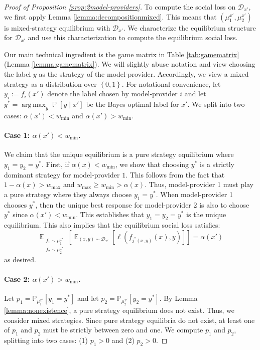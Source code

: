 \documentclass[letterpaper,11pt]{article}
\theoremstyle{plain}
\DeclareMathOperator*{\argmax}{arg\,max}
\DeclareMathOperator*{\E}{\mathbb{E}}
\DeclareMathOperator*{\Prob}{\mathbb{P}}
\begin{document}
\begin{proof}[Proof of Proposition \ref{prop:2model-providers}]
To compute the social loss on $\mathcal{D}_{x'}$, we first apply Lemma \ref{lemma:decompositionmixed}. This means that $(\mu^{x'}_1, \mu^{x'}_2)$ is mixed-strategy equilibrium with $\mathcal{D}_{x'}$. 
We characterize the equilibrium structure for $\mathcal{D}_{x'}$ and use this characterization to compute the equilibrium social loss. 



Our main technical ingredient is the game matrix in Table \ref{tab:gamematrix} (Lemma \ref{lemma:gamematrix}). We will slightly abuse notation and view choosing the label $y$ as the strategy of the model-provider. Accordingly, we view a mixed strategy as a distribution over $\left\{0,1\right\}$. For notational convenience, let $y_i := f_i(x')$ denote the label chosen by model-provider $i$ and let $y^* =  \argmax_{y} \Prob[y \mid x']$ be the Bayes optimal label for $x'$. 
We split into two cases: $\alpha(x') < w_{\text{min}}$ and $\alpha(x') > w_{\text{min}}$.

\paragraph{Case 1: $\alpha(x') < w_{\text{min}}$.} We claim that the unique equilibrium is a pure strategy equilibrium where $y_1 = y_2 = y^*$. First, if $\alpha(x) < w_{\text{min}}$, we show that choosing $y^*$ is a strictly dominant strategy for model-provider $1$. This follows from the fact that $1-\alpha(x) > w_{\text{max}}$ and $w_{\text{max}} \ge w_{\text{min}} >  \alpha(x)$. Thus, model-provider 1 must play a pure strategy where they always choose $y_1 = y^*$. When model-provider 1 chooses $y^*$, then the unique best response for model-provider 2 is also to choose $y^*$ since $\alpha(x') < w_{\text{min}}$. This establishes that $y_1 = y_2 = y^*$ is the unique equilibrium. This also implies that the equilibrium social loss satisfies:
\[\E_{\substack{f_1 \sim \mu^{x'}_1 \\ f_2 \sim \mu^{x'}_2}}\left[\E_{(x,y) \sim \mathcal{D}_{x'}}[\ell(f_{j^*(x,y)}(x), y)]\right] = \alpha(x')\]
as desired. 

\paragraph{Case 2: $\alpha(x') > w_{\text{min}}$.} Let $p_{1} = \mathbb{P}_{\mu^{x'}_1}[y_1 = y^*]$ and let $p_{2} = \mathbb{P}_{\mu^{x'}_2}[y_2 = y^*]$. By Lemma \ref{lemma:nonexistence}, a pure strategy equilibrium does not exist. Thus, we consider mixed strategies. 
Since pure strategy equilibria do not exist, at least one of $p_1$ and $p_2$ must be strictly between zero and one. We compute $p_1$ and $p_2$, splitting into two cases: (1) $p_1 > 0$ and (2) $p_2 > 0$.


\end{proof}
\end{document}
